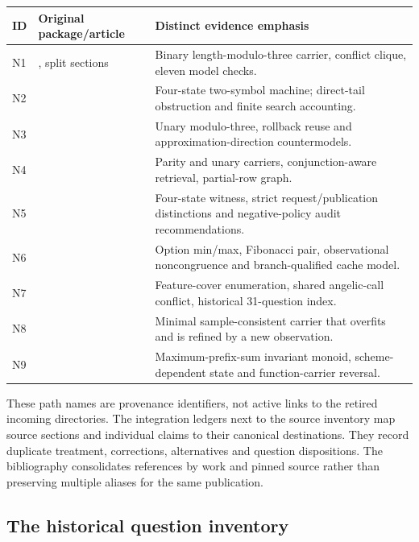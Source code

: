 \begin{longtable}{@{}L{10mm}L{71mm}L{68mm}@{}}
\toprule ID & Original package/article & Distinct evidence emphasis\\\midrule\endhead
N1 & , split sections & Binary length-modulo-three carrier, conflict clique, eleven model checks.\\
N2 &  & Four-state two-symbol machine; direct-tail obstruction and finite search accounting.\\
N3 &  & Unary modulo-three, rollback reuse and approximation-direction countermodels.\\
N4 &  & Parity and unary carriers, conjunction-aware retrieval, partial-row graph.\\
N5 &  & Four-state witness, strict request/publication distinctions and negative-policy audit recommendations.\\
N6 &  & Option min/max, Fibonacci pair, observational noncongruence and branch-qualified cache model.\\
N7 &  & Feature-cover enumeration, shared angelic-call conflict, historical 31-question index.\\
N8 &  & Minimal sample-consistent carrier that overfits and is refined by a new observation.\\
N9 &  & Maximum-prefix-sum invariant monoid, scheme-dependent state and function-carrier reversal.\\
\bottomrule
\end{longtable}

These path names are provenance identifiers, not active links to the retired
incoming directories. The integration ledgers next to the source inventory
map source sections and individual claims to their canonical destinations.
They record duplicate treatment, corrections, alternatives and question
dispositions. The bibliography consolidates references by work and pinned
source rather than preserving multiple aliases for the same publication.

\subsection{The historical question inventory}

